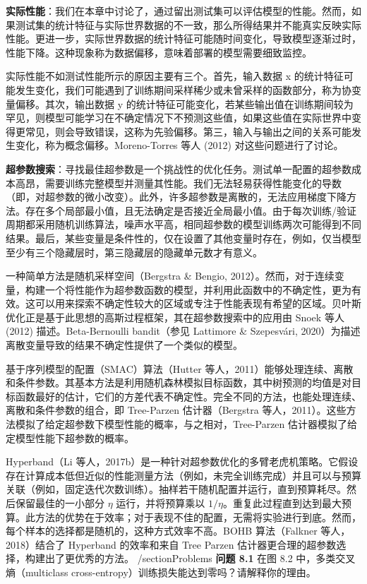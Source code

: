 \textbf{实际性能}：我们在本章中讨论了，通过留出测试集可以评估模型的性能。然而，如果测试集的统计特征与实际世界数据的不一致，那么所得结果并不能真实反映实际性能。更进一步，实际世界数据的统计特征可能随时间变化，导致模型逐渐过时，性能下降。这种现象称为数据偏移，意味着部署的模型需要细致监控。

实际性能不如测试性能所示的原因主要有三个。首先，输入数据 x 的统计特征可能发生变化，我们可能遇到了训练期间采样稀少或未曾采样的函数部分，称为协变量偏移。其次，输出数据 y 的统计特征可能变化，若某些输出值在训练期间较为罕见，则模型可能学习在不确定情况下不预测这些值，如果这些值在实际世界中变得更常见，则会导致错误，这称为先验偏移。第三，输入与输出之间的关系可能发生变化，称为概念偏移。Moreno-Torres 等人 (2012) 对这些问题进行了讨论。

\textbf{超参数搜索}：寻找最佳超参数是一个挑战性的优化任务。测试单一配置的超参数成本高昂，需要训练完整模型并测量其性能。我们无法轻易获得性能变化的导数（即，对超参数的微小改变）。此外，许多超参数是离散的，无法应用梯度下降方法。存在多个局部最小值，且无法确定是否接近全局最小值。由于每次训练/验证周期都采用随机训练算法，噪声水平高，相同超参数的模型训练两次可能得到不同结果。最后，某些变量是条件性的，仅在设置了其他变量时存在，例如，仅当模型至少有三个隐藏层时，第三隐藏层的隐藏单元数才有意义。

一种简单方法是随机采样空间（Bergstra \& Bengio, 2012）。然而，对于连续变量，构建一个将性能作为超参数函数的模型，并利用此函数中的不确定性，更为有效。这可以用来探索不确定性较大的区域或专注于性能表现有希望的区域。贝叶斯优化正是基于此思想的高斯过程框架，其在超参数搜索中的应用由 Snoek 等人 (2012) 描述。Beta-Bernoulli bandit（参见 Lattimore \& Szepesvári, 2020）为描述离散变量导致的结果不确定性提供了一个类似的模型。

基于序列模型的配置（SMAC）算法（Hutter 等人，2011）能够处理连续、离散和条件参数。其基本方法是利用随机森林模拟目标函数，其中树预测的均值是对目标函数最好的估计，它们的方差代表不确定性。完全不同的方法，也能处理连续、离散和条件参数的组合，即 Tree-Parzen 估计器（Bergstra 等人，2011）。这些方法模拟了给定超参数下模型性能的概率，与之相对，Tree-Parzen 估计器模拟了给定模型性能下超参数的概率。

Hyperband（Li 等人，2017b）是一种针对超参数优化的多臂老虎机策略。它假设存在计算成本低但近似的性能测量方法（例如，未完全训练完成）并且可以与预算关联（例如，固定迭代次数训练）。抽样若干随机配置并运行，直到预算耗尽。然后保留最佳的一小部分 \(\eta\) 运行，并将预算乘以 \(1/\eta\)。重复此过程直到达到最大预算。此方法的优势在于效率；对于表现不佳的配置，无需将实验进行到底。然而，每个样本的选择都是随机的，这种方式效率不高。BOHB 算法（Falkner 等人，2018）结合了 Hyperband 的效率和来自 Tree Parzen 估计器更合理的超参数选择，构建出了更优秀的方法。
/section{Problems}
\textbf{问题 8.1} 在图 8.2 中，多类交叉熵（multiclass cross-entropy）训练损失能达到零吗？请解释你的理由。

